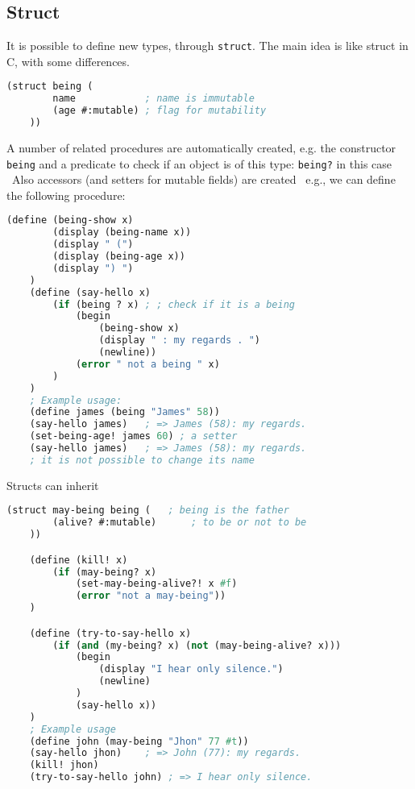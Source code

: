 \subsection{Struct}
It is possible to define new types, through \texttt{struct}.
The main idea is like struct in C, with some differences.
\begin{lstlisting}[language=Lisp]
    (struct being (
        name            ; name is immutable
        (age #:mutable) ; flag for mutability
    ))
\end{lstlisting}
A number of related procedures are automatically created, e.g. the constructor \texttt{being} and a predicate to check if an object is of this type: \texttt{being?} in this case \
Also accessors (and setters for mutable fields) are created \
e.g., we can define the following procedure:
\begin{lstlisting}[language=Lisp]
    (define (being-show x)
        (display (being-name x))
        (display " (")
        (display (being-age x))
        (display ") ")
    )
    (define (say-hello x)
        (if (being ? x) ; ; check if it is a being
            (begin
                (being-show x)
                (display " : my regards . ")
                (newline))
            (error " not a being " x)
        )
    )
    ; Example usage:
    (define james (being "James" 58))
    (say-hello james)   ; => James (58): my regards.
    (set-being-age! james 60) ; a setter
    (say-hello james)   ; => James (58): my regards.
    ; it is not possible to change its name
\end{lstlisting}
Structs can inherit
\begin{lstlisting}[language=Lisp]
    (struct may-being being (   ; being is the father
        (alive? #:mutable)      ; to be or not to be
    ))

    (define (kill! x)
        (if (may-being? x)
            (set-may-being-alive?! x #f)
            (error "not a may-being"))
    )

    (define (try-to-say-hello x)
        (if (and (my-being? x) (not (may-being-alive? x)))
            (begin
                (display "I hear only silence.")
                (newline)
            )
            (say-hello x))
    )
    ; Example usage
    (define john (may-being "Jhon" 77 #t))
    (say-hello jhon)    ; => John (77): my regards.
    (kill! jhon)
    (try-to-say-hello john) ; => I hear only silence.
\end{lstlisting}

